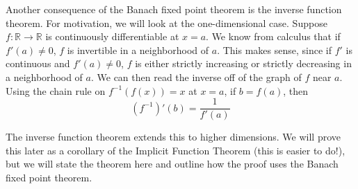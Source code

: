 \documentclass[12pt]{amsart}         %
\theoremstyle{remark}
\newcommand{\R}{\mathbb{R}}
\begin{document}
Another consequence of the Banach fixed point theorem is the inverse function theorem. For motivation, we will look at the one-dimensional case. Suppose $f: \R \rightarrow \R$ is continuously differentiable at $x = a$. We know from calculus that if $f'(a) \neq 0$, $f$ is invertible in a neighborhood of $a$. This makes sense, since if $f'$ is continuous and $f'(a) \neq 0$, $f$ is either strictly increasing or strictly decreasing in a neighborhood of $a$. We can then read the inverse off of the graph of $f$ near $a$. Using the chain rule on $f^{-1}(f(x)) = x$ at $x = a$, if $b = f(a)$, then
\[
(f^{-1})'(b) = \frac{1}{f'(a)}
\]

The inverse function theorem extends this to higher dimensions. We will prove this later as a corollary of the Implicit Function Theorem (this is easier to do!), but we will state the theorem here and outline how the proof uses the Banach fixed point theorem.
\end{document}
